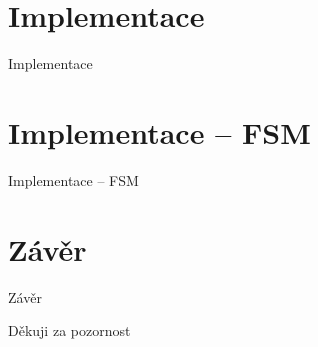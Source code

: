 \documentclass[10pt]{beamer}
\begin{document}
	\section{Implementace}
	\begin{frame}{Implementace}
	\end{frame}
	
	\section{Implementace – FSM}
	\begin{frame}{Implementace – FSM}
	\end{frame}

	\section{Závěr}
	\begin{frame}{Závěr}
	\end{frame}

	{
	\begin{frame}[noframenumbering] %
		Děkuji za pozornost
	\end{frame}
	}
	
\end{document}
